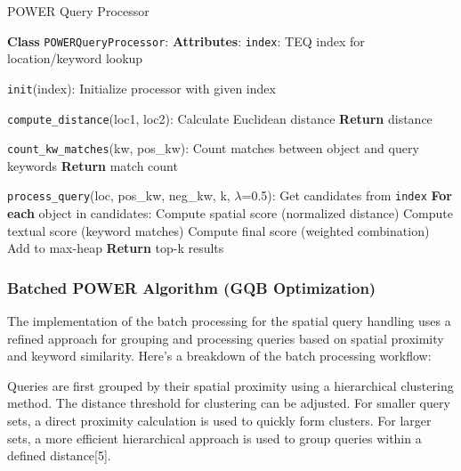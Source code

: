 \documentclass[conference]{IEEEtran}
\begin{document}
    \begin{algorithm}[htbp]
    \caption{POWER Query Processor}
    \label{alg:power_query}
    \begin{algorithmic}[1]
    \small  %
    
    \State \textbf{Class} \texttt{POWERQueryProcessor}:
    \Indent
        \State \textbf{Attributes}:
        \Indent
            \State \texttt{index}: TEQ index for location/keyword lookup
        \EndIndent
        
        \State \texttt{init}(index):
        \Indent
            \State Initialize processor with given index
        \EndIndent
        
        \State \texttt{compute\_distance}(loc1, loc2):
        \Indent
            \State Calculate Euclidean distance
            \State \textbf{Return} distance
        \EndIndent
        
        \State \texttt{count\_kw\_matches}(kw, pos\_kw):
        \Indent
            \State Count matches between object and query keywords
            \State \textbf{Return} match count
        \EndIndent
        
        \State \texttt{process\_query}(loc, pos\_kw, neg\_kw, k, \(\lambda\)=0.5):
        \Indent
            \State Get candidates from \texttt{index}
            \State \textbf{For each} object in candidates:
            \Indent
                \State Compute spatial score (normalized distance)
                \State Compute textual score (keyword matches)
                \State Compute final score (weighted combination)
                \State Add to max-heap
            \EndIndent
            \State \textbf{Return} top-k results
        \EndIndent
    \EndIndent
    
    \end{algorithmic}
    \end{algorithm}
    
    \subsubsection{\textbf{Batched POWER Algorithm (GQB Optimization)}}
    The implementation of the batch processing for the spatial query handling uses a refined approach for grouping and processing queries based on spatial proximity and keyword similarity. Here's a breakdown of the batch processing workflow:
    
    Queries are first grouped by their spatial proximity using a hierarchical clustering method. The distance threshold for clustering can be adjusted. For smaller query sets, a direct proximity calculation is used to quickly form clusters. For larger sets, a more efficient hierarchical approach is used to group queries within a defined distance[5].
    
\end{document}
